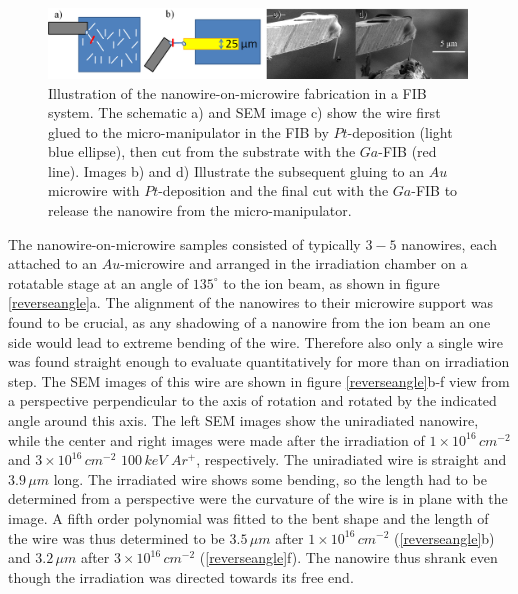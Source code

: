 \documentclass[12pt,
paper=a4,				
DIV=calc,		  %
BCOR=16mm,	  %
headinclude,
openany
]{scrbook}
\begin{document}
\begin{figure}[htbp]
	\centering
		\includegraphics[width=0.99\textwidth]{images/reverseFIB.png}
	\caption{Illustration of the nanowire-on-microwire fabrication in a FIB system. The schematic a) and SEM image c) show the wire first glued to the micro-manipulator in the FIB by $Pt$-deposition (light blue ellipse), then cut from the substrate with the $Ga$-FIB (red line). Images b) and d) Illustrate the subsequent gluing to an $Au$ microwire with $Pt$-deposition and the final cut with the $Ga$-FIB to release the nanowire from the micro-manipulator.}
	\label{reverseFIB}
\end{figure}

The nanowire-on-microwire samples consisted of typically $3-5$ nanowires, each attached to an $Au$-microwire and arranged in the irradiation chamber on a rotatable stage at an angle of $135^\circ$ to the ion beam, as shown in figure \ref{reverseangle}a. The alignment of the nanowires to their microwire support was found to be crucial, as any shadowing of a nanowire from the ion beam an one side would lead to extreme bending of the wire. Therefore also only a single wire was found straight enough to evaluate quantitatively for more than on irradiation step. The SEM images of this wire are shown in figure \ref{reverseangle}b-f view from a perspective perpendicular to the axis of rotation and rotated by the indicated angle around this axis. The left SEM images show the uniradiated nanowire, while the center and right images were made after the irradiation of $1\times10^{16}\,cm^{-2}$ and $3\times10^{16}\,cm^{-2}$ $100\,keV\,\,Ar^+$, respectively. The uniradiated wire is straight and $3.9\,\mu m$ long. The irradiated wire shows some bending, so the length had to be determined from a perspective were the curvature of the wire is in plane with the image. A fifth order polynomial was fitted to the bent shape and the length of the wire was thus determined to be $3.5\,\mu m$ after $1\times10^{16}\,cm^{-2}$ (\ref{reverseangle}b) and $3.2\,\mu m$ after $3\times10^{16}\,cm^{-2}$ (\ref{reverseangle}f). The nanowire thus shrank even though the irradiation was directed towards its free end.
\end{document}
